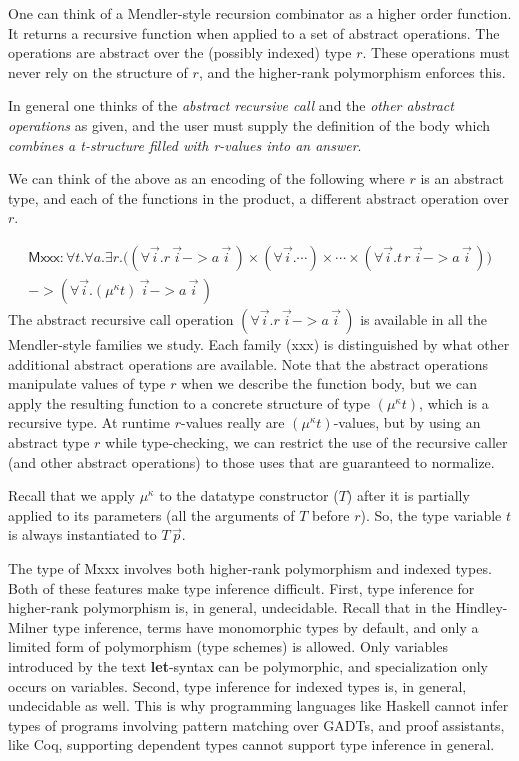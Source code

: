 One can think of a Mendler-style recursion combinator as a higher order function.
It returns a recursive function when applied to a set of abstract operations. The
operations are abstract over the (possibly indexed) type $r$. These operations
must never rely on the structure of $r$, and the higher-rank polymorphism enforces
this.

In general one thinks of the {\em abstract recursive call} and the {\em other
abstract operations} as given, and the user must supply the definition of the body
which {\em combines a t-structure filled with r-values into an answer}.


We can think of the above as an encoding of the following where $r$ is an abstract
type, and each of the functions in the product, a different abstract operation over $r$.

\begin{multline*}
 \textsf{Mxxx} : \forall t . \forall a .
 \exists r.
  \big(  (\forall\vec{i} . r\,\vec{i} -> a\,\vec{i}\,)
   \times (\forall\vec{i} . \cdots) \times \cdots
   \times (\forall\vec{i} . t\, r\,\vec{i} -> a\,\vec{i}\,)
   \big) \\
 -> (\forall\vec{i} . (\mu^\kappa t)\,\vec{i} -> a\,\vec{i}\,)
\end{multline*}
The abstract recursive call operation $(\forall\vec{i} . r\,\vec{i} -> a\,\vec{i}\,)$ is available in
all the Mendler-style families we study. Each family (\textsf{xxx})
is distinguished by what other additional abstract operations are available.
Note that the abstract operations manipulate values of type $r$ when we describe
the function body, but we can apply the resulting function
to a concrete structure of type $(\mu^\kappa t)$, which is a recursive type.
At runtime $r$-values really are $(\mu^\kappa t)$-values, but
by using an abstract type $r$ while type-checking, we
can restrict the use of the recursive caller (and other abstract operations) to those uses that are guaranteed to normalize. 

Recall that we apply $\mu^\kappa$ to the datatype constructor ($T$) after it is
partially applied to its parameters (all the arguments of $T$ before $r$). So,
the type variable $t$ is always instantiated to $T\,\vec{p}$.

The type of \textsf{Mxxx} involves both higher-rank polymorphism and
indexed types. Both of these features make type inference difficult.
First, type inference for higher-rank polymorphism is, in general, undecidable.
Recall that in the Hindley-Milner type inference, terms have monomorphic types
by default, and only a limited form of polymorphism (type schemes) is allowed.
Only variables introduced by the text {\bf let}-syntax can be
polymorphic, and specialization only occurs on variables. 
Second, type inference for indexed types is, in general, undecidable as well.
This is why programming languages like Haskell cannot infer types of programs
involving pattern matching over GADTs, and proof assistants, like Coq,
supporting dependent types cannot support type inference in general. 

